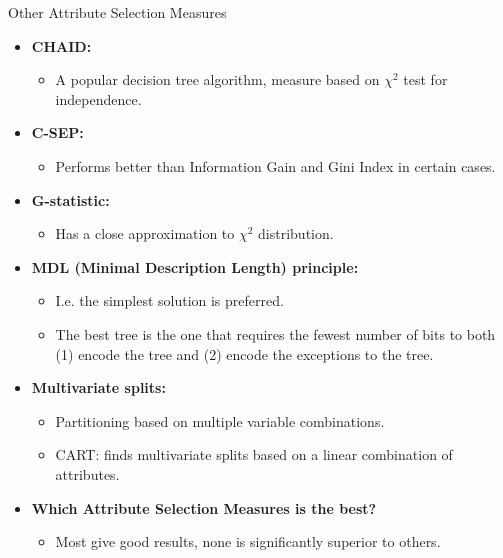 \begin{frame}{Other Attribute Selection Measures}
	\begin{itemize}
		\item \textbf{CHAID:}
		      \begin{itemize}
			      \item A popular decision tree algorithm, measure based on $\chi^2$ test for independence.
		      \end{itemize}
		\item \textbf{C-SEP:}
		      \begin{itemize}
			      \item Performs better than Information Gain and Gini Index in certain cases.
		      \end{itemize}
		\item \textbf{G-statistic:}
		      \begin{itemize}
			      \item Has a close approximation to $\chi^2$ distribution.
		      \end{itemize}
		\item \textbf{MDL (Minimal Description Length) principle:}
		      \begin{itemize}
			      \item I.e. the simplest solution is preferred.
			      \item The best tree is the one that requires the fewest number of bits to both (1) encode the tree and (2) encode the exceptions to the tree.
		      \end{itemize}
		\item \textbf{Multivariate splits:}
		      \begin{itemize}
			      \item Partitioning based on multiple variable combinations.
			      \item CART: finds multivariate splits based on a linear combination of attributes.
		      \end{itemize}
		\item \textbf{Which Attribute Selection Measures is the best?}
		      \begin{itemize}
			      \item Most give good results, none is significantly superior to others.
		      \end{itemize}
	\end{itemize}
\end{frame}

